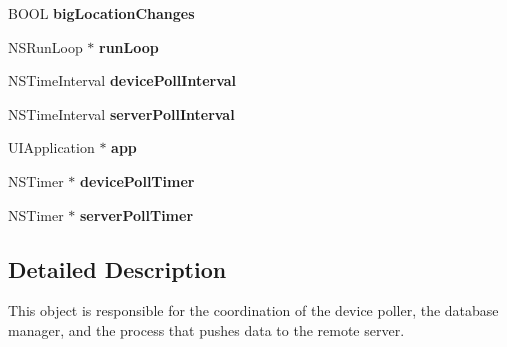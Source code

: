 \begin{DoxyCompactItemize}
\item 
\hypertarget{interface_background_scheduler_ab3abcae0c98a5c753ef26adba1cbf090}{B\-O\-O\-L {\bfseries big\-Location\-Changes}}\label{interface_background_scheduler_ab3abcae0c98a5c753ef26adba1cbf090}

\item 
\hypertarget{interface_background_scheduler_a73f120ac0977837ac4a4095ad96d01ec}{N\-S\-Run\-Loop $\ast$ {\bfseries run\-Loop}}\label{interface_background_scheduler_a73f120ac0977837ac4a4095ad96d01ec}

\item 
\hypertarget{interface_background_scheduler_ae2e25ad686446576c71a500b66f31e25}{N\-S\-Time\-Interval {\bfseries device\-Poll\-Interval}}\label{interface_background_scheduler_ae2e25ad686446576c71a500b66f31e25}

\item 
\hypertarget{interface_background_scheduler_a6a4ebd391d86c9779122136b6c4dfc1c}{N\-S\-Time\-Interval {\bfseries server\-Poll\-Interval}}\label{interface_background_scheduler_a6a4ebd391d86c9779122136b6c4dfc1c}

\item 
\hypertarget{interface_background_scheduler_a8c133b6375de7c3e0cda3ac605ad2029}{U\-I\-Application $\ast$ {\bfseries app}}\label{interface_background_scheduler_a8c133b6375de7c3e0cda3ac605ad2029}

\item 
\hypertarget{interface_background_scheduler_a9dee3016296e3a529451c25b426b8923}{N\-S\-Timer $\ast$ {\bfseries device\-Poll\-Timer}}\label{interface_background_scheduler_a9dee3016296e3a529451c25b426b8923}

\item 
\hypertarget{interface_background_scheduler_ab78e335cbdbd2c276c299380a982f0e4}{N\-S\-Timer $\ast$ {\bfseries server\-Poll\-Timer}}\label{interface_background_scheduler_ab78e335cbdbd2c276c299380a982f0e4}

\end{DoxyCompactItemize}


\subsection{Detailed Description}
This object is responsible for the coordination of the device poller, the database manager, and the process that pushes data to the remote server. 

